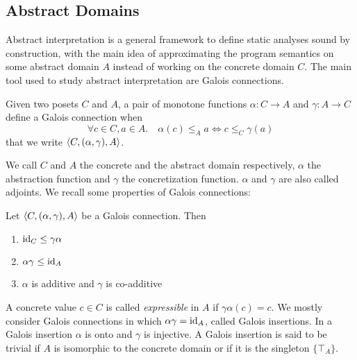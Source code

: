 \subsection{Abstract Domains}
Abstract interpretation \cite{CC77,CC79} is a general framework to define static analyses sound by construction, with the main idea of approximating the program semantics on some abstract domain $A$ instead of working on the concrete domain $C$. The main tool used to study abstract interpretation are Galois connections.
\begin{definition}
	Given two posets $C$ and $A$, a pair of monotone functions $\alpha : C \rightarrow A$ and $\gamma : A \rightarrow C$ define a Galois connection when
	\[
	\forall c \in C, a \in A.\quad \alpha(c) \le_A a \iff c \le_C \gamma(a)
	\]
	that we write $\langle C, (\alpha, \gamma), A \rangle$.
\end{definition}
We call $C$ and $A$ the concrete and the abstract domain respectively, $\alpha$ the abstraction function and $\gamma$ the concretization function. $\alpha$ and $\gamma$ are also called adjoints.
We recall some properties of Galois connections:
\begin{prop}
	Let $\langle C, (\alpha, \gamma), A \rangle$ be a Galois connection. Then
	\begin{enumerate}
		\item $\text{id}_C \le \gamma \alpha$
		\item $\alpha \gamma \le \text{id}_A$
		\item $\alpha$ is additive and $\gamma$ is co-additive
	\end{enumerate}
\end{prop}
A concrete value $c \in C$ is called \emph{expressible} in $A$ if $\gamma \alpha(c) = c$.
We mostly consider Galois connections in which $\alpha \gamma = \text{id}_A$, called Galois insertions. In a Galois insertion $\alpha$ is onto and $\gamma$ is injective.
A Galois insertion is said to be trivial if $A$ is isomorphic to the concrete domain or if it is the singleton $\{ \top_A \}$.

